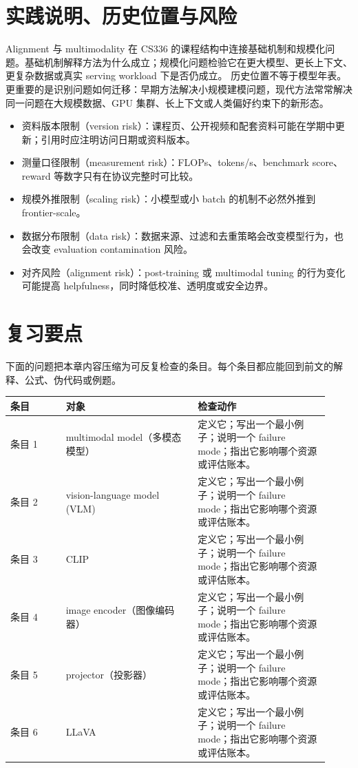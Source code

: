 \documentclass[a4paper]{article}
\begin{document}
\section{实践说明、历史位置与风险}
Alignment 与 multimodality 在 CS336 的课程结构中连接基础机制和规模化问题。基础机制解释方法为什么成立；规模化问题检验它在更大模型、更长上下文、更复杂数据或真实 serving workload 下是否仍成立。
历史位置不等于模型年表。更重要的是识别问题如何迁移：早期方法解决小规模建模问题，现代方法常常解决同一问题在大规模数据、GPU 集群、长上下文或人类偏好约束下的新形态。
\begin{itemize}
\item 资料版本限制（version risk）：课程页、公开视频和配套资料可能在学期中更新；引用时应注明访问日期或资料版本。
\item 测量口径限制（measurement risk）：FLOPs、tokens/s、benchmark score、reward 等数字只有在协议完整时可比较。
\item 规模外推限制（scaling risk）：小模型或小 batch 的机制不必然外推到 frontier-scale。
\item 数据分布限制（data risk）：数据来源、过滤和去重策略会改变模型行为，也会改变 evaluation contamination 风险。
\item 对齐风险（alignment risk）：post-training 或 multimodal tuning 的行为变化可能提高 helpfulness，同时降低校准、透明度或安全边界。
\end{itemize}
\section{复习要点}
下面的问题把本章内容压缩为可反复检查的条目。每个条目都应能回到前文的解释、公式、伪代码或例题。
\begin{longtable}{p{0.16\linewidth}p{0.38\linewidth}p{0.38\linewidth}}
\toprule
\textbf{条目} & \textbf{对象} & \textbf{检查动作}\\
\midrule
条目 1 & multimodal model（多模态模型） & 定义它；写出一个最小例子；说明一个 failure mode；指出它影响哪个资源或评估账本。\\
条目 2 & vision-language model (VLM) & 定义它；写出一个最小例子；说明一个 failure mode；指出它影响哪个资源或评估账本。\\
条目 3 & CLIP & 定义它；写出一个最小例子；说明一个 failure mode；指出它影响哪个资源或评估账本。\\
条目 4 & image encoder（图像编码器） & 定义它；写出一个最小例子；说明一个 failure mode；指出它影响哪个资源或评估账本。\\
条目 5 & projector（投影器） & 定义它；写出一个最小例子；说明一个 failure mode；指出它影响哪个资源或评估账本。\\
条目 6 & LLaVA & 定义它；写出一个最小例子；说明一个 failure mode；指出它影响哪个资源或评估账本。\\
\bottomrule
\end{longtable}
\end{document}
